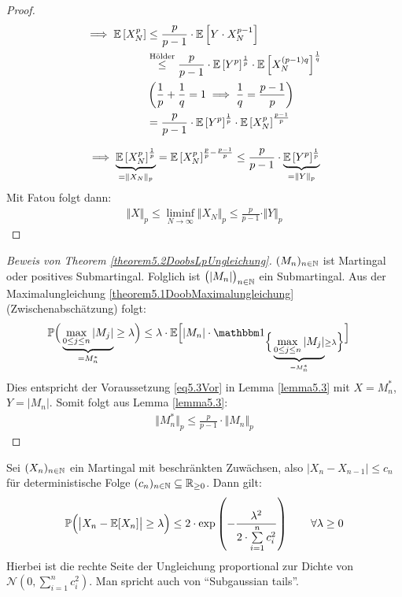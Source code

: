 \begin{proof}
	\begin{align*}
		\implies
		\mathbb{E}\left[X_N^p\right]
		&\leq \frac{p}{p-1}\cdot\mathbb{E}\left[Y\cdot X_N^{p-1}\right] \\
		&\stackrel{\text{Hölder}}{\leq}
		\frac{p}{p-1}\cdot\mathbb{E}\left[Y^p\right]^{\frac{1}{p}}\cdot\mathbb{E}\left[X_N^{(p-1)q}\right]^{\frac{1}{q}}\\
		&\left(\frac{1}{p} + \frac{1}{q} = 1 \implies \frac{1}{q} = \frac{p-1}{p}\right) \\
		&=\frac{p}{p-1}\cdot\mathbb{E}\left[Y^p\right]^{\frac{1}{p}}\cdot\mathbb{E}\left[X_N^{p}\right]^{\frac{p-1}{p}}
	\end{align*}
	
	\begin{align*}
		\implies
		\underbrace{\mathbb{E}\left[X_N^p\right]^{\frac{1}{p}}}_{=\Vert X_N\Vert_p}
		=\mathbb{E}\left[X_N^p\right]^{\frac{p}{p}-\frac{p-1}{p}}
		\leq
		\frac{p}{p-1}\cdot\underbrace{\mathbb{E}\left[Y^p\right]^{\frac{1}{p}}}_{=\Vert Y\Vert_p}
	\end{align*}
	Mit Fatou folgt dann:
	\begin{align*}
		\Vert X\Vert_p\leq\liminf\limits_{N\to\infty}\Vert X_N\Vert_p\leq\frac{p}{p-1}\cdot\Vert Y\Vert_p
	\end{align*}
\end{proof}

\begin{proof}[Beweis von Theorem \ref{theorem5.2DoobsLpUngleichung}]\enter
	$(M_n)_{n\in\mathbb{N}}$ ist Martingal oder positives Submartingal.
	Folglich ist $\big(|M_n|\big)_{n\in\mathbb{N}}$ ein Submartingal.
	Aus der Maximalungleichung 	\ref{theorem5.1DoobMaximalungleichung} (Zwischenabschätzung) folgt:
	\begin{align*}
		\P\Big(\underbrace{\max\limits_{0\leq j\leq n}|M_j|}_{=M_n^\ast}\geq\lambda\Big)
		&\leq\lambda\cdot\E\Big[|M_n|\cdot\indi_{\Big\lbrace\underbrace{\max\limits_{0\leq j\leq n}|M_j|}_{=M_n^\ast}\geq\lambda\Big\rbrace}\Big]
	\end{align*}
	Dies entspricht der Voraussetzung \eqref{eq5.3Vor} in Lemma \ref{lemma5.3} mit $X=M_n^\ast$, $Y=|M_n|$. Somit folgt aus Lemma \ref{lemma5.3}:
	\begin{align*}
		\big\Vert M_n^\ast\big\Vert_p\leq\frac{p}{p-1}\cdot\big\Vert M_n\big\Vert_p
	\end{align*}
\end{proof}

\begin{theorem}\label{theorem5.4AzumasUngleichung}\enter
	Sei $(X_n)_{n\in\mathbb{N}}$ ein Martingal mit beschränkten Zuwächsen, also $\big|X_n-X_{n-1}\big|\leq c_n$ für deterministische Folge $(c_n)_{n\in\mathbb{N}}\subseteq\mathbb{R}_{\geq0}$. Dann gilt:
	\begin{align*}
		\mathbb{P}\Big(\big|X_n-\mathbb{E}[X_n]\big|\geq\lambda\Big)\leq2\cdot\exp\left(-\frac{\lambda^2}{2\cdot\sum\limits_{i=1}^n c_i^2}\right)\qquad\forall\lambda\geq0
	\end{align*}
	Hierbei ist die rechte Seite der Ungleichung proportional zur Dichte von $\mathcal{N}\left(0,\sum\limits_{i=1}^n c_i^2\right)$.
	Man spricht auch von ``Subgaussian tails''.
\end{theorem}


